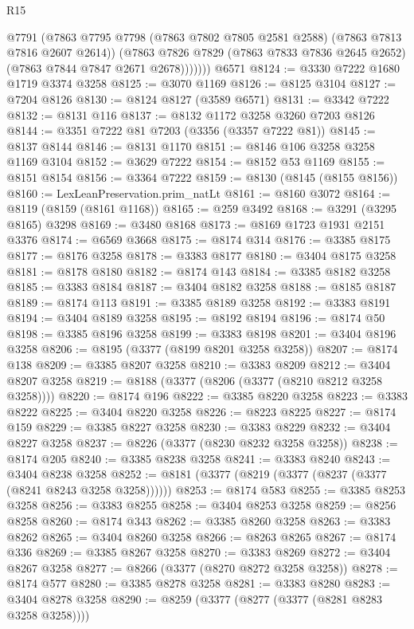 \begin{lexlean}{R15}
\begin{coremodule}
              @7791
              (@7863 @7795 @7798 (@7863 @7802 @7805 @2581 @2588) (@7863 @7813 @7816 @2607 @2614))
              (@7863
                @7826
                @7829
                (@7863 @7833 @7836 @2645 @2652)
                (@7863 @7844 @7847 @2671 @2678)))))))
    @6571
@8124 := @3330 @7222 @1680 @1719 @3374 @3258
@8125 := @3070 @1169
@8126 := @8125 @3104
@8127 := @7204 @8126
@8130 := @8124 @8127 (@3589 @6571)
@8131 := @3342 @7222
@8132 := @8131 @116
@8137 := @8132 @1172 @3258 @3260 @7203 @8126
@8144 := @3351 @7222 @81 @7203 (@3356 (@3357 @7222 @81))
@8145 := @8137 @8144
@8146 := @8131 @1170
@8151 := @8146 @106 @3258 @3258 @1169 @3104
@8152 := @3629 @7222
@8154 := @8152 @53 @1169
@8155 := @8151 @8154
@8156 := @3364 @7222
@8159 := @8130 (@8145 (@8155 @8156))
@8160 := LexLeanPreservation.prim_natLt
@8161 := @8160 @3072
@8164 := @8119 (@8159 (@8161 @1168))
@8165 := @259 @3492
@8168 := @3291 (@3295 @8165) @3298
@8169 := @3480 @8168
@8173 := @8169 @1723 @1931 @2151 @3376
@8174 := @6569 @3668
@8175 := @8174 @314
@8176 := @3385 @8175
@8177 := @8176 @3258
@8178 := @3383 @8177
@8180 := @3404 @8175 @3258
@8181 := @8178 @8180
@8182 := @8174 @143
@8184 := @3385 @8182 @3258
@8185 := @3383 @8184
@8187 := @3404 @8182 @3258
@8188 := @8185 @8187
@8189 := @8174 @113
@8191 := @3385 @8189 @3258
@8192 := @3383 @8191
@8194 := @3404 @8189 @3258
@8195 := @8192 @8194
@8196 := @8174 @50
@8198 := @3385 @8196 @3258
@8199 := @3383 @8198
@8201 := @3404 @8196 @3258
@8206 := @8195 (@3377 (@8199 @8201 @3258 @3258))
@8207 := @8174 @138
@8209 := @3385 @8207 @3258
@8210 := @3383 @8209
@8212 := @3404 @8207 @3258
@8219 := @8188 (@3377 (@8206 (@3377 (@8210 @8212 @3258 @3258))))
@8220 := @8174 @196
@8222 := @3385 @8220 @3258
@8223 := @3383 @8222
@8225 := @3404 @8220 @3258
@8226 := @8223 @8225
@8227 := @8174 @159
@8229 := @3385 @8227 @3258
@8230 := @3383 @8229
@8232 := @3404 @8227 @3258
@8237 := @8226 (@3377 (@8230 @8232 @3258 @3258))
@8238 := @8174 @205
@8240 := @3385 @8238 @3258
@8241 := @3383 @8240
@8243 := @3404 @8238 @3258
@8252 := @8181 (@3377 (@8219 (@3377 (@8237 (@3377 (@8241 @8243 @3258 @3258))))))
@8253 := @8174 @583
@8255 := @3385 @8253 @3258
@8256 := @3383 @8255
@8258 := @3404 @8253 @3258
@8259 := @8256 @8258
@8260 := @8174 @343
@8262 := @3385 @8260 @3258
@8263 := @3383 @8262
@8265 := @3404 @8260 @3258
@8266 := @8263 @8265
@8267 := @8174 @336
@8269 := @3385 @8267 @3258
@8270 := @3383 @8269
@8272 := @3404 @8267 @3258
@8277 := @8266 (@3377 (@8270 @8272 @3258 @3258))
@8278 := @8174 @577
@8280 := @3385 @8278 @3258
@8281 := @3383 @8280
@8283 := @3404 @8278 @3258
@8290 := @8259 (@3377 (@8277 (@3377 (@8281 @8283 @3258 @3258))))

\end{coremodule}
\end{lexlean}
